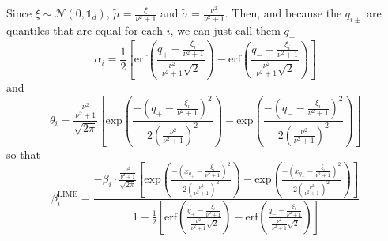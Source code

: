 
Since $\xi \sim \mathcal{N}(0,\mathds{1}_d)$, $\tilde{\mu} = \frac{\xi}{\nu^2+1}$ and $\tilde{\sigma} = \frac{\nu^2}{\nu^2+1}$. Then, and because the $q_{i\pm}$ are quantiles that are equal for each $i$, we can just call them $q_{\pm}$%
        \begin{equation*}
            \alpha_i = \frac{1}{2}\left[\text{erf} \left( \frac{q_{+}-\frac{\xi_i}{\nu^2+1}}{\frac{\nu^2}{\nu^2+1}\sqrt{2}} \right) - \text{erf} \left( \frac{q_{-}-\frac{\xi_i}{\nu^2+1}}{\frac{\nu^2}{\nu^2+1}\sqrt{2}} \right) \right]
        \end{equation*}
        and
        \begin{equation*}
            \theta_i = \frac{\frac{\nu^2}{\nu^2+1}}{\sqrt{2\pi}}\left[\text{exp}\left(\frac{-(q_+ -\frac{\xi_i}{\nu^2+1})^2}{2(\frac{\nu^2}{\nu^2+1})^2}\right) - \text{exp}\left(\frac{-(q_- -\frac{\xi_i}{\nu^2+1})^2}{2(\frac{\nu^2}{\nu^2+1})^2}\right)\right]
        \end{equation*}
        so that
        \begin{equation}
            \beta^{\text{LIME}}_i = \frac{-\beta_i \cdot \frac{\frac{\nu^2}{\nu^2+1}}{\sqrt{2\pi}}\left[\text{exp}\left(\frac{-(x_{q_+}-\frac{\xi_i}{\nu^2+1})^2}{2(\frac{\nu^2}{\nu^2+1})^2}\right) - \text{exp}\left(\frac{-(x_{q_-}-\frac{\xi_i}{\nu^2+1})^2}{2(\frac{\nu^2}{\nu^2+1})^2}\right)\right]}{1 - \frac{1}{2}\left[\text{erf} \left( \frac{q_+-\frac{\xi_i}{\nu^2+1}}{\frac{\nu^2}{\nu^2+1}\sqrt{2}} \right) - \text{erf} \left( \frac{q_--\frac{\xi_i}{\nu^2+1}}{\frac{\nu^2}{\nu^2+1}\sqrt{2}} \right) \right]}
        \end{equation}


